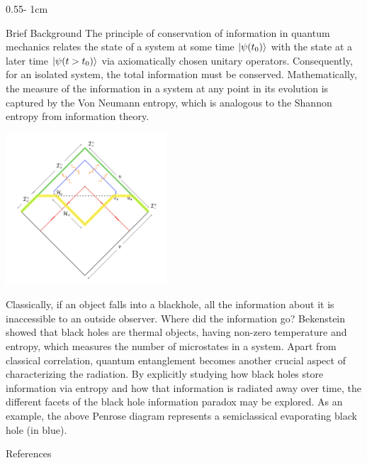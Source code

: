 \documentclass{../psuposter}
\begin{document}
\begin{frame}
\begin{columns}[t, totalwidth=\textwidth]
\begin{column}{0.55\textwidth - 1cm}
    \begin{block}{Brief Background}
        The principle of conservation of information in quantum mechanics relates the state of a system at some time $\ket{\psi(t_0)}$ with the state at a later time $\ket{\psi(t>t_0)}$ via axiomatically chosen unitary operators. Consequently, for an isolated system, the total information must be conserved. Mathematically, the measure of the information in a system at any point in its evolution is captured by the Von Neumann entropy, which is analogous to the Shannon entropy from information theory. \cite{stromingerBlackHoleInformation2019}		
        \begin{center}
		   	\includegraphics[width=0.45\textwidth]{images/evap}    		
    	\end{center}
		Classically, if an object falls into a blackhole, all the information about it is inaccessible to an outside observer. Where did the information go? Bekenstein showed that black holes are thermal objects, having non-zero temperature and entropy, which measures the number of microstates in a system. Apart from classical correlation, quantum entanglement becomes another crucial aspect of characterizing the radiation. \cite{stromingerBlackHoleInformation2019} By explicitly studying how black holes store information via entropy and how that information is radiated away over time, the different facets of the black hole information paradox may be explored. As an example, the above Penrose diagram represents a semiclassical evaporating black hole (in blue). \cite{hawkingSoftHairBlack2016}

    \end{block}


    \begin{block}{References}
        
%        
		
    \end{block}


\end{column}
\end{columns}
\end{frame}
\end{document}
